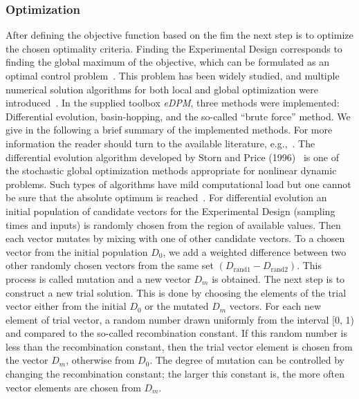 \documentclass[graybox]{svmult}
\begin{document}
\subsubsection*{Optimization}
After defining the objective function based on the \ac{fim} the next step is to optimize the chosen optimality criteria.
Finding the Experimental Design corresponds to finding the global maximum of the objective, which can be formulated as an optimal control problem~\cite{espie_optimal_1989}.
This problem has been widely studied, and multiple numerical solution algorithms for both local and global optimization were introduced~\cite{esposito_global_2000, bangaImprovingFoodProcessing2003, ali_numerical_1997, runarsson_stochastic_2000}.
In the supplied toolbox {\it eDPM}, three methods were implemented: Differential evolution, basin-hopping, and the so-called “brute force” method.
We give in the following a brief summary of the implemented methods.
For more information the reader should turn to the available literature, e.g.,~\cite{stornDifferentialEvolutionSimple1997, wales_global_1997}.
\newline
%
The differential evolution algorithm developed by Storn and Price (1996)~\cite{stornDifferentialEvolutionSimple1997} is one of the stochastic global optimization methods appropriate for nonlinear dynamic problems.
Such types of algorithms have mild computational load but one cannot be sure that the absolute optimum is reached~\cite{balsa-cantoe.bangaj.r.COMPUTINGOPTIMALDYNAMIC2008}.
For differential evolution an initial population of candidate vectors for the Experimental Design (sampling times and inputs) is randomly chosen from the region of available values.
Then each vector mutates by mixing with one of other candidate vectors.
To a chosen vector from the initial population $D_0$, we add a weighted difference between two other randomly chosen vectors from the same set $(D_\text{rand1} - D_\text{rand2})$.
This process is called mutation and a new vector $D_m$ is obtained.
The next step is to construct a new trial solution.
This is done by choosing the elements of the trial vector either from the initial $D_0$ or the mutated $D_m$ vectors.
For each new element of trial vector, a random number drawn uniformly from the interval [0, 1) and compared to the so-called recombination constant.
If this random number is less than the recombination constant, then the trial vector element is chosen from the vector $D_m$, otherwise from $D_0$.
The degree of mutation can be controlled by changing the recombination constant; the larger this constant is, the more often vector elements are chosen from $D_m$.
\end{document}
